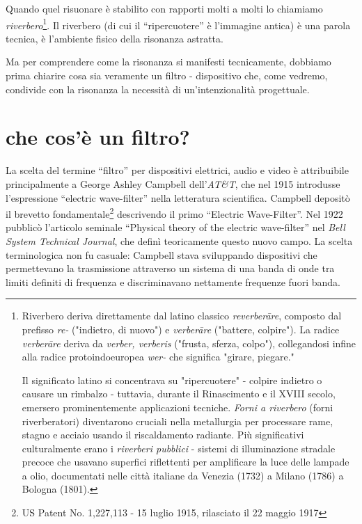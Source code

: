 Quando quel risuonare è stabilito con rapporti molti a molti lo chiamiamo
\emph{riverbero}\footnote{
  Riverbero deriva direttamente dal latino classico \emph{reverberāre}, composto
  dal prefisso \emph{re-} ("indietro, di nuovo") e \emph{verberāre} ("battere,
  colpire"). La radice \emph{verberāre} deriva da \emph{verber, verberis} ("frusta,
  sferza, colpo"), collegandosi infine alla radice protoindoeuropea \emph{wer-}
  che significa "girare, piegare."

  Il significato latino si concentrava su "ripercuotere" - colpire indietro o
  causare un rimbalzo - tuttavia, durante il Rinascimento e il XVIII secolo,
  emersero prominentemente applicazioni tecniche. \emph{Forni a riverbero} (forni
  riverberatori) diventarono cruciali nella metallurgia per processare rame,
  stagno e acciaio usando il riscaldamento radiante. Più significativi
  culturalmente erano i \emph{riverberi pubblici} - sistemi di illuminazione
  stradale precoce che usavano superfici riflettenti per amplificare la luce delle
  lampade a olio, documentati nelle città italiane da Venezia (1732) a Milano
  (1786) a Bologna (1801).
}. Il riverbero (di cui il “ripercuotere” è l'immagine antica) è
una parola tecnica, è l'ambiente fisico della risonanza astratta.

Ma per comprendere come la risonanza si manifesti tecnicamente, dobbiamo prima chiarire cosa sia veramente un filtro - dispositivo che, come vedremo, condivide con la risonanza la necessità di un'intenzionalità progettuale.

\section{che cos'è un filtro?}

La scelta del termine “filtro” per dispositivi elettrici, audio e video è
attribuibile principalmente a George Ashley Campbell dell'\emph{AT\&T}, che nel
1915 introdusse l'espressione “electric wave-filter” nella letteratura scientifica.
Campbell depositò il brevetto fondamentale\footnote{US Patent No. 1,227,113 - 15
luglio 1915, rilasciato il 22 maggio 1917} descrivendo il primo “Electric
Wave-Filter”. Nel 1922 pubblicò l'articolo seminale “Physical theory of the
electric wave-filter” nel \emph{Bell System Technical Journal}, che definì
teoricamente questo nuovo campo. La scelta terminologica non fu casuale:
Campbell stava sviluppando dispositivi che permettevano la trasmissione
attraverso un sistema di una banda di onde tra limiti definiti di frequenza e
discriminavano nettamente frequenze fuori banda.

